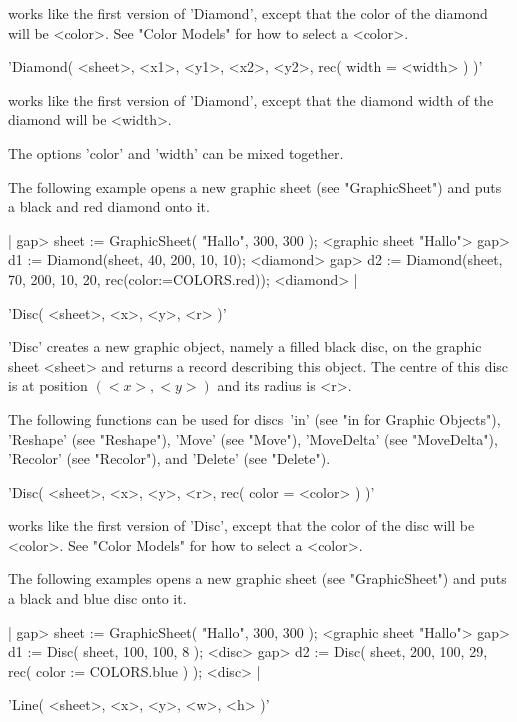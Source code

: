 works like the first  version of 'Diamond',  except that the color  of the
diamond will be <color>.  See "Color Models" for how to select a <color>.

'Diamond( <sheet>, <x1>, <y1>, <x2>, <y2>, rec( width \:= <width> ) )'

works like the first version of 'Diamond',  except that the diamond width
of the diamond will be <width>.

The options 'color' and 'width' can be mixed together.

The following example opens a  new graphic sheet (see "GraphicSheet") and
puts a black and red diamond onto it.

|    gap> sheet := GraphicSheet( "Hallo", 300, 300 );
    <graphic sheet "Hallo">
    gap> d1 := Diamond(sheet, 40, 200, 10, 10);
    <diamond>
    gap> d2 := Diamond(sheet, 70, 200, 10, 20, rec(color:=COLORS.red));
    <diamond> |


'Disc( <sheet>, <x>, <y>, <r> )'

'Disc' creates a new  graphic object, namely a filled  black disc, on the
graphic sheet <sheet> and returns a {\GAP} record describing this object.
The centre of this disc is at position $(<x>,<y>)$ and its radius is <r>.

The following   functions can  be used  for  discs\:\  'in' (see  "in for
Graphic Objects"), 'Reshape'     (see "Reshape"), 'Move'   (see  "Move"),
'MoveDelta'  (see  "MoveDelta"), 'Recolor'  (see "Recolor"), and 'Delete'
(see "Delete").

'Disc( <sheet>, <x>, <y>, <r>, rec( color \:= <color> ) )'

works like the first version of 'Disc', except that the color of the disc
will be <color>.  See "Color Models" for how to select a <color>.

The following examples opens a new graphic sheet (see "GraphicSheet") and
puts  a  black and blue disc onto it.

|    gap> sheet := GraphicSheet(  "Hallo", 300, 300 );
    <graphic sheet "Hallo">
    gap> d1 := Disc( sheet, 100, 100, 8 );
    <disc>
    gap> d2 := Disc( sheet, 200, 100, 29, rec( color := COLORS.blue ) );
    <disc> |


'Line( <sheet>, <x>, <y>, <w>, <h> )'

